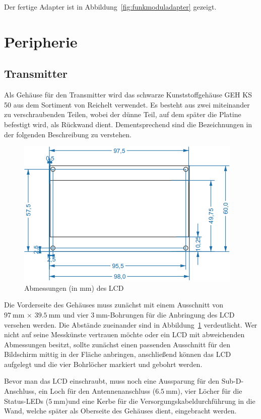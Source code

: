 \documentclass[paper=a4, parskip, numbers=noenddot, toc=listof, headsepline]{scrbook}
\begin{document}
				Der fertige Adapter ist in Abbildung~\ref{fig:funkmoduladapter} gezeigt.

			\section{Peripherie}

				\subsection{Transmitter}
					Als Gehäuse für den Transmitter wird das schwarze Kunststoffgehäuse GEH KS 50 aus dem Sortiment von Reichelt verwendet. Es besteht aus zwei miteinander zu verschraubenden Teilen, wobei der dünne Teil, auf dem später die Platine befestigt wird, als Rückwand dient. Dementsprechend sind die Bezeichnungen in der folgenden Beschreibung zu verstehen.

					\begin{figure}
						\centering
						\includegraphics[]{bilder/lcddimensions}
						\caption{Abmessungen (in mm) des LCD}
						\label{fig:lcddimensions}
					\end{figure}

					Die Vorderseite des Gehäuses muss zunächst mit einem Ausschnitt von $\SI{97}{\milli\metre}\,\times\,\SI{39,5}{\milli\metre}$ und vier $\SI{3}{\milli\metre}$-Bohrungen für die Anbringung des LCD versehen werden. Die Abstände zueinander sind in Abbildung~\ref{fig:lcddimensions} verdeutlicht. Wer nicht auf seine Messkünste vertrauen möchte oder ein LCD mit abweichenden Abmessungen besitzt, sollte zunächst einen passenden Ausschnitt für den Bildschirm mittig in der Fläche anbringen, anschließend können das LCD aufgelegt und die vier Bohrlöcher markiert und gebohrt werden.

					Bevor man das LCD einschraubt, muss noch eine Aussparung für den Sub-D-Anschluss, ein Loch für den Antennenanschluss ($\SI{6,5}{\milli\metre}$), vier Löcher für die Status-LEDs ($\SI{5}{\milli\metre}$)und eine Kerbe für die Versorgungskabeldurchführung in die Wand, welche später als Oberseite des Gehäuses dient, eingebracht werden.
\end{document}
